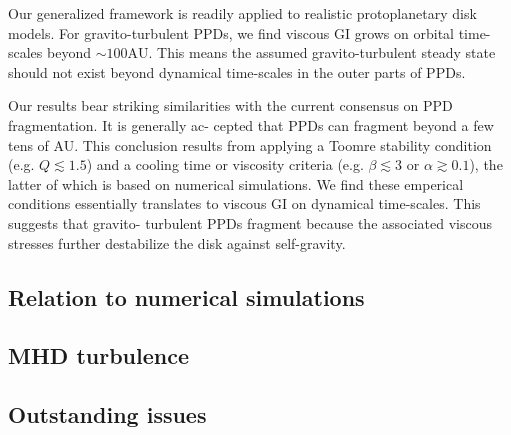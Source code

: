 
Our generalized framework is
readily applied to realistic protoplanetary disk models. For
gravito-turbulent PPDs, we find viscous GI grows on orbital time-scales
beyond $\sim 100\mathrm{AU}$. This means the assumed gravito-turbulent
steady state should not exist beyond dynamical time-scales in the
outer parts of PPDs. 

Our results bear striking similarities with the current
consensus on PPD fragmentation. It is generally ac-
cepted that PPDs can fragment beyond a few tens of
AU. This conclusion results from applying a Toomre
stability condition (e.g. $Q\lesssim 1.5$) and a cooling time or
viscosity criteria (e.g. $\beta\lesssim3$ or $\alpha\gtrsim 0.1$), the latter of
which is based on numerical simulations. We find these
emperical conditions essentially translates to viscous GI
on dynamical time-scales. This suggests that gravito-
turbulent PPDs fragment because the associated viscous
stresses further destabilize the disk against self-gravity.




\subsection{Relation to numerical simulations}\label{prev_works}








\subsection{MHD turbulence}

\subsection{Outstanding issues}
